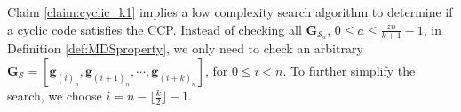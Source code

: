 \documentclass[journal,twocolumn]{IEEEtran}
\theoremstyle{definition}
\newcommand{\calS}{\mathcal{S}}
\newcommand{\bfg}{\mathbf{g}}
\newcommand{\bfG}{\mathbf{G}}
\newcommand{\aditya}[1]{\marginpar{+}{\bf Aditya's remark}: {\em #1}}
\begin{document}
Claim \ref{claim:cyclic_k1} implies a low complexity search algorithm to determine if a cyclic code satisfies the CCP. Instead of checking all $\bfG_{\calS_a}$, $0\le a\le \frac{zn}{k+1}-1$, in Definition \ref{def:MDSproperty}, we only need to check an arbitrary $\bfG_{\calS}=[\bfg_{(i)_n},\bfg_{(i+1)_n},\cdots,\bfg_{(i+k)_n}]$, for $0\le i< n$. %
To further simplify the search, we choose $i=n-\lfloor \frac{k}{2}\rfloor-1$.%
\end{document}
